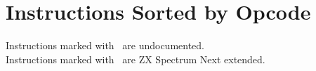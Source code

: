 \documentclass[12pt,twoside,openright,a4paper]{book}
\begin{document}
\pagebreak
\IntentionallyEmpty
\pagebreak


\chapter{Instructions Sorted by Opcode}


Instructions marked with \UNDOC ~are undocumented.\\
Instructions marked with \ZXN ~are ZX Spectrum Next extended.
\end{document}
